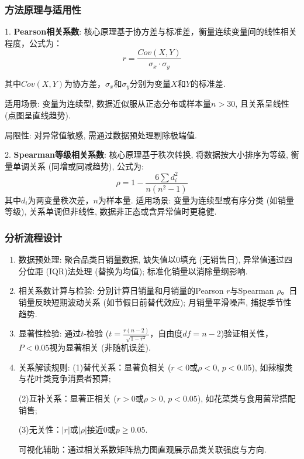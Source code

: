 \documentclass{MathNoteCN}
\begin{document}
\subsubsection{方法原理与适用性}
1. \textbf{Pearson相关系数}:   
核心原理基于协方差与标准差，衡量连续变量间的线性相关程度，公式为：  
\begin{equation}
r=\frac{Cov(X,Y)}{\sigma_x \cdot \sigma_y}
\end{equation}  

其中$Cov(X,Y)$为协方差，$\sigma_x$和$\sigma_y$分别为变量$X$和$Y$的标准差.  

适用场景: 变量为连续型, 数据近似服从正态分布或样本量$n>30$, 且关系呈线性 (点图呈直线趋势). 

局限性: 对异常值敏感, 需通过数据预处理剔除极端值. 

2. \textbf{Spearman等级相关系数}:   
核心原理基于秩次转换, 将数据按大小排序为等级, 衡量单调关系 (同增或同减趋势), 公式为: 
\begin{equation}
\rho=1-\frac{6\sum d_i^2}{n(n^2-1)}
\end{equation}  
其中$d_i$为两变量秩次差，$n$为样本量.  
适用场景: 变量为连续型或有序分类 (如销量等级), 关系单调但非线性, 数据非正态或含异常值时更稳健.

\subsubsection{分析流程设计}
\begin{enumerate}
    \item 数据预处理: 聚合品类日销量数据, 缺失值以0填充 (无销售日), 异常值通过四分位距 (IQR)法处理 (替换为均值); 标准化销量以消除量纲影响. 
    \item 相关系数计算与检验: 分别计算日销量和月销量的Pearson $r$与Spearman $\rho$。日销量反映短期波动关系 (如节假日前替代效应); 月销量平滑噪声, 捕捉季节性趋势. 
    \item 显著性检验: 通过$t$-检验 ($t=\frac{r(n-2)}{\sqrt{1-r^2}}$，自由度$df=n-2$)验证相关性，$P<0.05$视为显著相关 (非随机误差). 
    \item 关系解读规则: 
    (1)替代关系：显著负相关 ($r<0$或$\rho<0$, $p<0.05$), 如辣椒类与花叶类竞争消费者预算; 

    (2)互补关系：显著正相关 ($r>0$或$\rho>0$, $p<0.05$), 如花菜类与食用菌常搭配销售;  

    (3)无关性：$|r|$或$|\rho|$接近0或$p≥0.05$.

    可视化辅助：通过相关系数矩阵热力图直观展示品类关联强度与方向. 
\end{enumerate}
\end{document}

